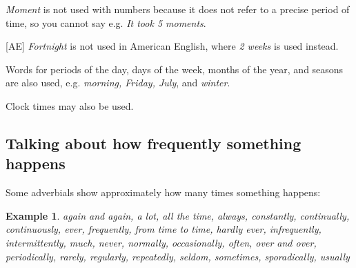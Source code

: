 \documentclass[oneside]{book}
\numberwithin{equation}{section}
\newtheorem{example}{Example}[section]
\begin{document}
\textit{Moment} is not used with numbers because it does not refer to a precise period of time, so you cannot say e.g. \textit{It took 5 moments}.

%
[AE] \textit{Fortnight} is not used in American English, where \textit{2 weeks} is used instead.

%
Words for periods of the day, days of the week, months of the year, and seasons are also used, e.g. \textit{morning, Friday, July}, and \textit{winter}.

%
Clock times may also be used.

\subsection{Talking about how frequently something happens}
\noindent{} Some adverbials show approximately how many times something happens:
\begin{example}
    again and again, a lot, all the time, always, constantly, continually, continuously, ever, frequently, from time to time, hardly ever, infrequently, intermittently, much, never, normally, occasionally, often, over and over, periodically, rarely, regularly, repeatedly, seldom, sometimes, sporadically, usually
\end{example}
\end{document}
